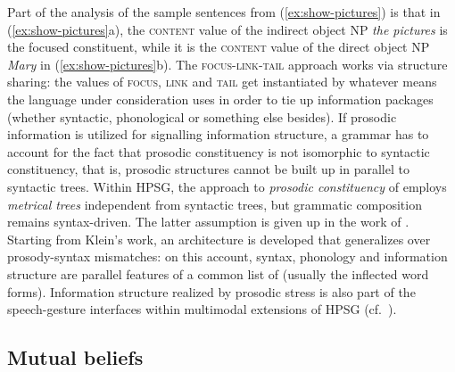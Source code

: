 \documentclass[output=paper
 	        ,biblatex
                ,babelshorthands
                ,newtxmath
                ,draftmode
                ,colorlinks, citecolor=brown
]{langscibook}
\begin{document}
Part of the analysis of the sample sentences from (\ref{ex:show-pictures}) is that in (\ref{ex:show-pictures}a), the \textsc{content} value of the indirect object NP \textit{the pictures} is the focused constituent, while it is the \textsc{content} value of the direct object NP \textit{Mary} in (\ref{ex:show-pictures}b).
%
The \textsc{focus-link-tail} approach works via structure sharing: the values of \textsc{focus}, \textsc{link} and \textsc{tail} get instantiated by whatever means the language under consideration uses in order to tie up information packages (whether syntactic, phonological or something else besides).
%
If prosodic information is utilized for signalling information structure, a grammar has to account for the fact that prosodic constituency is not isomorphic to syntactic constituency, that is, prosodic structures cannot be built up in parallel to syntactic trees. 
%
Within HPSG, the approach to \emph{prosodic constituency} of \citet{Klein:2000} employs \emph{metrical trees} independent from syntactic trees, but grammatic composition remains syntax-driven.
%
The latter assumption is given up in the work of \citet{Haji-Abdolhosseini2003a}. %
%
Starting from Klein's work, an architecture is developed that generalizes over prosody-syntax mismatches: on this account, syntax, phonology and information structure are parallel features of a common list of  (usually the inflected word forms).
%
Information structure realized by prosodic stress is also part of the speech-gesture interfaces within multimodal extensions of HPSG (cf.\ ).



\subsection{Mutual beliefs}
\label{sec:mutual-beliefs}
\end{document}
